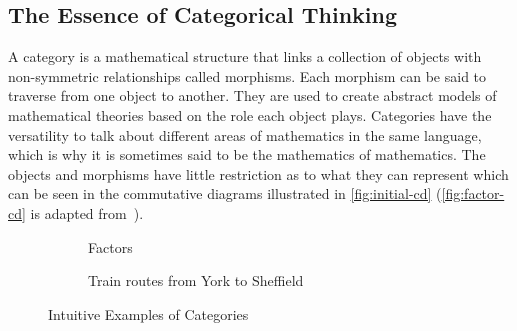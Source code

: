 %
%
\subsection{The Essence of Categorical Thinking}

A category is a mathematical structure that links a collection of objects with
non-symmetric relationships called morphisms. Each morphism can be said to
traverse from one object to another. They are used to create abstract models of
mathematical theories based on the role each object plays. Categories have the
versatility to talk about different areas of mathematics in the same language,
which is why it is sometimes said to be the mathematics of mathematics. The
objects and morphisms have little restriction as to what they can represent
which can be seen in the commutative diagrams illustrated in
\autoref{fig:initial-cd} (\autoref{fig:factor-cd} is adapted
from~\autocite{Cheng:2022}).
\begin{figure}[ht]
        \vspace{\belowcaptionskip}
        \begin{subfigure}{.45\textwidth}
                \centering
                \vspace{1em}%
                \caption{Factors}%
                \label{fig:factor-cd}
        \end{subfigure}
        \vspace{-\belowcaptionskip}%
        \begin{subfigure}{.45\textwidth}
                \centering
                \vspace{1em}%
                \caption{Train routes from York to Sheffield}
        \end{subfigure}%
        \caption{Intuitive Examples of Categories}%
        \label{fig:initial-cd}
\end{figure}

